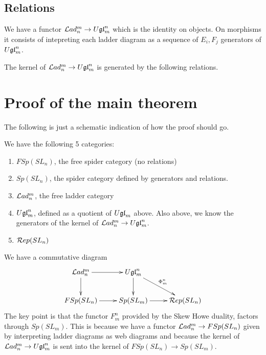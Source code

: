\documentclass[11pt,leqno]{article}
\begin{document}
\subsection{Relations}
We have a functor $ \mathcal{L}ad_n^m \rightarrow U\mathfrak{gl}_{m}^n $ which is the identity on objects.  On morphisms it consists of intepreting each ladder diagram as a sequence of $ E_i, F_j $ generators of $ U\mathfrak{gl}_{m}^n $.

\begin{thm}
The kernel of $ \mathcal{L}ad_n^m \rightarrow U\mathfrak{gl}_{m}^n $ is generated by the following relations.
\end{thm}



\section{Proof of the main theorem}
\label{sec:theorem}

The following is just a schematic indication of how the proof should go.

We have the following 5 categories:
\begin{enumerate}
\item $FSp(SL_n) $, the free spider category (no relations)
\item $Sp(SL_n) $, the spider category defined by generators and relations.
\item $\mathcal{L}ad_n^m$, the free ladder category
\item $U\mathfrak{gl}_{m}^n $, defined as a quotient of $ U\mathfrak{gl}_{m} $ above.  Also above, we know the generators of the kernel of $ \mathcal{L}ad_n^m \rightarrow U\mathfrak{gl}_{m}^n $.
\item $\mathcal{R}ep(SL_{n})$
\end{enumerate}

We have a commutative diagram
\begin{equation*}
\xymatrix{
\Lad_n^m \ar[r] \ar[d] & \Ugl{m}^n \ar[dr]^{\Phi_m^n} \ar[d] & \\
FSp(SL_n) \ar[r] & Sp(SL_m) \ar[r] & \RepSL{n} \\
}
\end{equation*}
The key point is that the functor $ F_m^n $ provided by the Skew Howe duality, factors through $ Sp(SL_m)$.  This is because we have a functor $ \mathcal{L}ad_n^m \rightarrow FSp(SL_n) $ given by interpreting ladder diagrams as web diagrams and because the kernel of $ \mathcal{L}ad_n^m \rightarrow U\mathfrak{gl}_{m}^n $ is sent into the kernel of $ FSp(SL_n) \rightarrow Sp(SL_m) $.  
\end{document}
